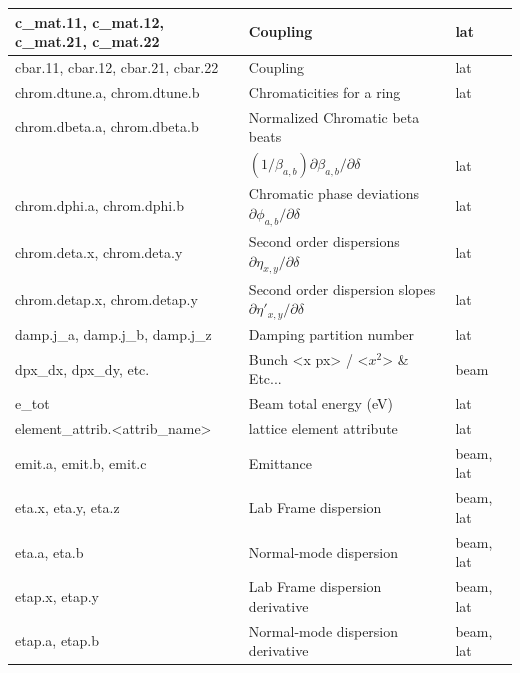 {\begin{longtable}{lll}
  c_mat.11, c_mat.12, c_mat.21, c_mat.22
                                      & Coupling                                      & lat       \\ \hline 

  cbar.11, cbar.12, cbar.21, cbar.22
                                      & Coupling                                      & lat       \\ \hline 

  chrom.dtune.a, chrom.dtune.b        & Chromaticities for a ring                     & lat       \\ \hline
  chrom.dbeta.a, chrom.dbeta.b        & Normalized Chromatic beta beats  \\ 
                      &$(1/\beta_{a,b})\partial\beta_{a,b}/\partial\delta$            & lat       \\ \hline
  chrom.dphi.a, chrom.dphi.b          & Chromatic phase deviations $\partial\phi_{a,b}/\partial\delta$    & lat       \\ \hline
  chrom.deta.x, chrom.deta.y          & Second order dispersions $\partial\eta_{x,y}/\partial\delta$      & lat       \\ \hline
  chrom.detap.x, chrom.detap.y        & Second order dispersion slopes $\partial\eta'_{x,y}/\partial\delta$    & lat       \\ \hline

  damp.j_a, damp.j_b, damp.j_z        & Damping partition number                      & lat       \\ \hline

  dpx\_dx, dpx\_dy, etc.              & Bunch <x px> / <$x^2$> \& Etc...              & beam      \\ \hline 

  e\_tot                              & Beam total energy (eV)                        & lat       \\ \hline

  element\_attrib.<attrib\_name>      & lattice element attribute                     & lat       \\ \hline

  emit.a, emit.b, emit.c              & Emittance                                     & beam, lat \\ \hline

  eta.x, eta.y, eta.z                 & Lab Frame dispersion                          & beam, lat \\ \hline 
  eta.a, eta.b                        & Normal-mode dispersion                        & beam, lat \\ \hline 
  etap.x, etap.y                      & Lab Frame dispersion derivative               & beam, lat \\ \hline 
  etap.a, etap.b                      & Normal-mode dispersion derivative             & beam, lat \\ \hline 


\end{longtable}}
